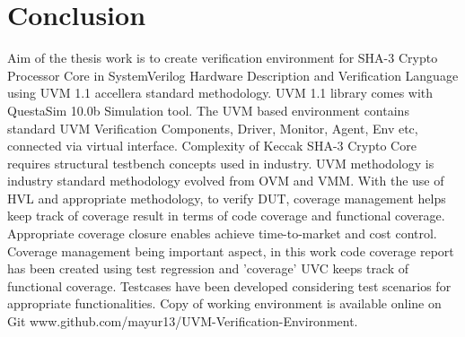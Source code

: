 \chapter*{Conclusion}

Aim of the thesis work is to create verification environment for SHA-3 Crypto Processor Core in SystemVerilog Hardware Description and Verification Language using UVM 1.1 accellera standard methodology. UVM 1.1 library comes with QuestaSim 10.0b Simulation tool. The UVM based environment contains standard UVM Verification Components, Driver, Monitor, Agent, Env etc, connected via virtual interface. Complexity of Keccak SHA-3 Crypto Core requires structural testbench concepts used in industry. UVM methodology is industry standard methodology evolved from OVM and VMM. With the use of HVL and appropriate methodology, to verify DUT, coverage management helps keep track of coverage result in terms of code coverage and functional coverage. Appropriate coverage closure enables achieve time-to-market and cost control. Coverage management being important aspect, in this work code coverage report has been created using test regression and 'coverage' UVC keeps track of functional coverage. Testcases have been developed considering test scenarios for appropriate functionalities. Copy of working environment is available online on Git www.github.com/mayur13/UVM-Verification-Environment.